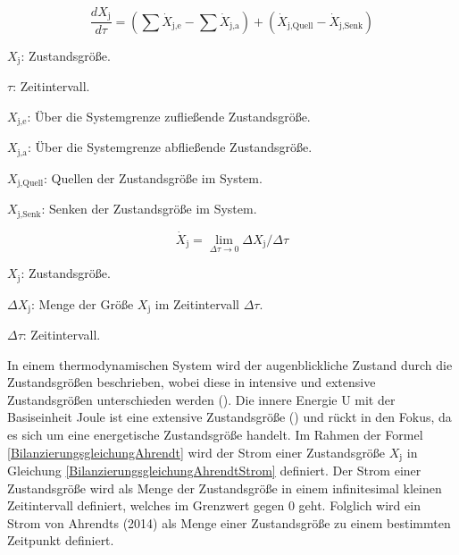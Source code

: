 \begin{equation}
    \frac{dX_{\text{j}}}{d\tau} = (\sum \dot{X}_{\text{j,e}} - \sum \dot{X}_{\text{j,a}}) + (\dot{X}_{\text{j,Quell}} - \dot{X}_{\text{j,Senk}})
    \label{BilanzierungsgleichungAhrendt}
\end{equation}

\begin{description}
    \item \(X_{\text{j}}\): Zustandsgröße.
    \item \(\tau\): Zeitintervall.
    \item \(X_{\text{j,e}}\): Über die Systemgrenze zufließende Zustandsgröße.
    \item \(X_{\text{j,a}}\): Über die Systemgrenze abfließende Zustandsgröße.
    \item \(X_{\text{j,Quell}}\): Quellen der Zustandsgröße im System.
    \item \(X_{\text{j,Senk}}\): Senken der Zustandsgröße im System.
\end{description}


\begin{equation}
    \dot{X}_{\text{j}} = \lim_{\Delta\tau \to 0} \Delta X_{\text{j}}/ \Delta\tau
    \label{BilanzierungsgleichungAhrendtStrom}
\end{equation}

\begin{description}
    \item \(X_{\text{j}}\): Zustandsgröße.
    \item \(\Delta X_{\text{j}}\): Menge der Größe \(X_{\text{j}}\) im Zeitintervall \(\Delta \tau\).
    \item \(\Delta \tau\): Zeitintervall.
\end{description}


In einem thermodynamischen System wird der augenblickliche Zustand durch die Zustandsgrößen beschrieben, wobei diese in intensive und extensive Zustandsgrößen unterschieden werden (\cite[S. 66]{Konstantin.2023}). Die innere Energie 
U mit der Basiseinheit Joule ist eine extensive Zustandsgröße (\cite[S. 65]{Konstantin.2023}) und rückt in den Fokus, da es sich um eine energetische Zustandsgröße handelt.
Im Rahmen der Formel \eqref{BilanzierungsgleichungAhrendt} wird der Strom einer Zustandsgröße \(X_{\text{j}}\) in Gleichung \eqref{BilanzierungsgleichungAhrendtStrom} definiert.
Der Strom einer Zustandsgröße wird als Menge der Zustandsgröße in einem infinitesimal kleinen Zeitintervall definiert, welches im Grenzwert gegen 0 geht.
Folglich wird ein Strom von Ahrendts (2014) als Menge einer Zustandsgröße zu einem bestimmten Zeitpunkt definiert.

